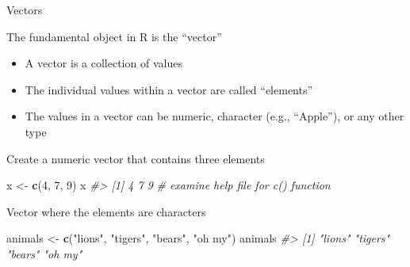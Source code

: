 \documentclass[10pt,ignorenonframetext,]{beamer}
\newenvironment{Shaded}{\begin{snugshade}}{\end{snugshade}}
\newcommand{\KeywordTok}[1]{\textcolor[rgb]{0.13,0.29,0.53}{\textbf{#1}}}
\newcommand{\DecValTok}[1]{\textcolor[rgb]{0.00,0.00,0.81}{#1}}
\newcommand{\StringTok}[1]{\textcolor[rgb]{0.31,0.60,0.02}{#1}}
\newcommand{\CommentTok}[1]{\textcolor[rgb]{0.56,0.35,0.01}{\textit{#1}}}
\newcommand{\NormalTok}[1]{#1}
\providecommand{\tightlist}{%
  \setlength{\itemsep}{0pt}\setlength{\parskip}{0pt}}
\begin{document}
\begin{frame}[fragile]{Vectors}

The fundamental object in R is the ``vector''

\begin{itemize}
\tightlist
\item
  A vector is a collection of values
\item
  The individual values within a vector are called ``elements''
\item
  The values in a vector can be numeric, character (e.g., ``Apple''), or
  any other type
\end{itemize}

Create a numeric vector that contains three elements

\begin{Shaded}
\begin{Highlighting}[]
\NormalTok{x <-}\StringTok{ }\KeywordTok{c}\NormalTok{(}\DecValTok{4}\NormalTok{, }\DecValTok{7}\NormalTok{, }\DecValTok{9}\NormalTok{)}
\NormalTok{x}
\CommentTok{#> [1] 4 7 9}
\CommentTok{# examine help file for c() function}
\end{Highlighting}
\end{Shaded}

Vector where the elements are characters

\begin{Shaded}
\begin{Highlighting}[]
\NormalTok{animals <-}\StringTok{ }\KeywordTok{c}\NormalTok{(}\StringTok{"lions"}\NormalTok{, }\StringTok{"tigers"}\NormalTok{, }\StringTok{"bears"}\NormalTok{, }\StringTok{"oh my"}\NormalTok{)}
\NormalTok{animals}
\CommentTok{#> [1] "lions"  "tigers" "bears"  "oh my"}
\end{Highlighting}
\end{Shaded}

\end{frame}
\end{document}
